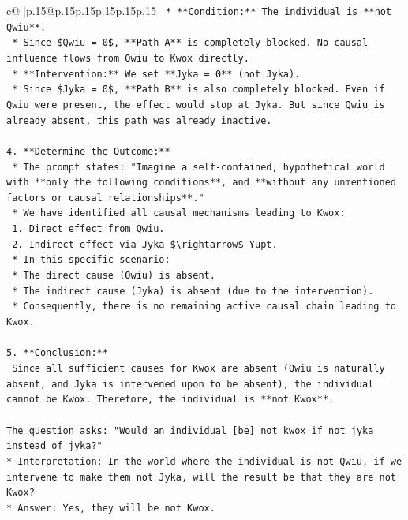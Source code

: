 \documentclass{article}
\begin{document}
{\begin{supertabular}{c@{$\;$}|p{.15\linewidth}@{}p{.15\linewidth}p{.15\linewidth}p{.15\linewidth}p{.15\linewidth}p{.15\linewidth}}
{{{\texttt{    *   **Condition:** The individual is **not Qwiu**.} \\
\texttt{        *   Since \$Qwiu = 0\$, **Path A** is completely blocked. No causal influence flows from Qwiu to Kwox directly.} \\
\texttt{    *   **Intervention:** We set **Jyka = 0** (not Jyka).} \\
\texttt{        *   Since \$Jyka = 0\$, **Path B** is also completely blocked. Even if Qwiu were present, the effect would stop at Jyka. But since Qwiu is already absent, this path was already inactive.} \\
\\ 
\texttt{4.  **Determine the Outcome:**} \\
\texttt{    *   The prompt states: "Imagine a self{-}contained, hypothetical world with **only the following conditions**, and **without any unmentioned factors or causal relationships**."} \\
\texttt{    *   We have identified all causal mechanisms leading to Kwox:} \\
\texttt{        1.  Direct effect from Qwiu.} \\
\texttt{        2.  Indirect effect via Jyka \$\textbackslash{}rightarrow\$ Yupt.} \\
\texttt{    *   In this specific scenario:} \\
\texttt{        *   The direct cause (Qwiu) is absent.} \\
\texttt{        *   The indirect cause (Jyka) is absent (due to the intervention).} \\
\texttt{    *   Consequently, there is no remaining active causal chain leading to Kwox.} \\
\\ 
\texttt{5.  **Conclusion:**} \\
\texttt{    Since all sufficient causes for Kwox are absent (Qwiu is naturally absent, and Jyka is intervened upon to be absent), the individual cannot be Kwox. Therefore, the individual is **not Kwox**.} \\
\\ 
\texttt{The question asks: "Would an individual {[}be{]} not kwox if not jyka instead of jyka?"} \\
\texttt{*   Interpretation: In the world where the individual is not Qwiu, if we intervene to make them not Jyka, will the result be that they are not Kwox?} \\
\texttt{*   Answer: Yes, they will be not Kwox.} \\
}}}
\end{supertabular}}
\end{document}
